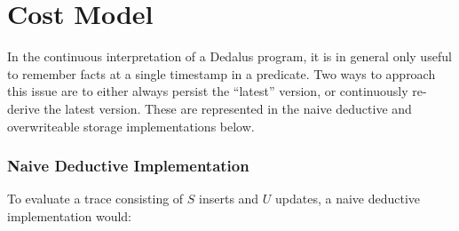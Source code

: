 \section{Cost Model}





In the continuous interpretation of a Dedalus program, it is in general only
useful to remember facts at a single timestamp in a predicate.  Two ways to
approach this issue are to either always persist the ``latest'' version, or
continuously re-derive the latest version.  These are represented in the naive
deductive and overwriteable storage implementations below.



\subsubsection{Naive Deductive Implementation}

To evaluate a trace consisting of $S$ inserts and $U$ updates, a naive
deductive implementation would:

